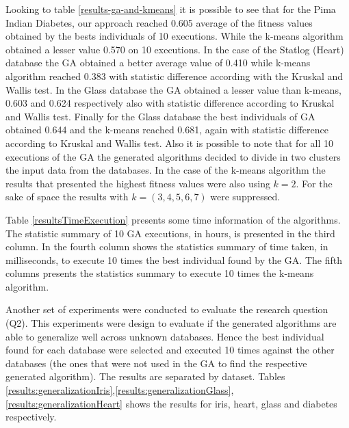 \documentclass[journal]{IEEEtran}
\begin{document}
Looking to table \ref{results-ga-and-kmeans} it is possible to see that for the Pima Indian Diabetes, our approach reached 0.605 average of the fitness values obtained by the bests individuals of 10 executions. While the k-means algorithm obtained a lesser value 0.570 on 10 executions. 
In the case of the Statlog (Heart) database the GA obtained a better average value of 0.410 while k-means algorithm reached 0.383 with statistic difference according with the Kruskal and Wallis test.
In the Glass database the GA obtained a lesser value than k-means, 0.603 and 0.624 respectively also with statistic difference according to Kruskal and Wallis test. 
Finally for the Glass database the best individuals of GA obtained 0.644 and the k-means reached 0.681, again with statistic difference according to Kruskal and Wallis test.
Also it is possible to note that for all 10 executions of the GA the generated algorithms decided to divide in two clusters the input data from the databases. In the case of the k-means algorithm the results that presented the highest fitness values were also using $k=2$. For the sake of space the results with $k = (3,4,5,6,7)$ were suppressed.

Table \ref{resultsTimeExecution} presents some time information of the algorithms. The statistic summary of 10 GA executions, in hours, is presented in the third column. In the fourth column shows the statistics summary of time taken, in milliseconds, to execute 10 times the best individual found by the GA. The fifth columns presents the statistics summary to execute 10 times the k-means algorithm.

Another set of experiments were conducted to evaluate the research question (Q2). This experiments were design to evaluate if the generated algorithms are able to generalize well across unknown databases. Hence the best individual found for each database were selected and executed 10 times against the other databases (the ones that were not used in the GA to find the respective generated algorithm). The results are separated by dataset. Tables \ref{results:generalizationIris},\ref{results:generalizationGlass},\ref{results:generalizationHeart} shows the results for iris, heart, glass and diabetes respectively.
\end{document}
